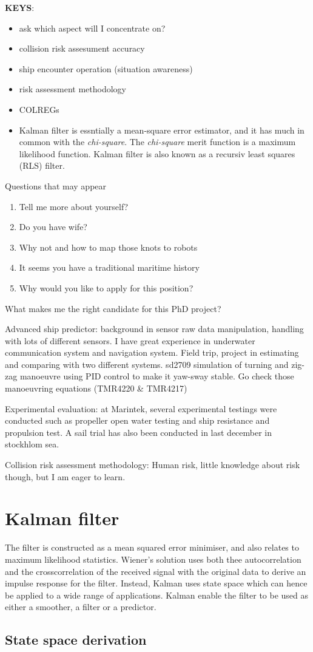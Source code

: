 \documentclass{report}
\begin{document}
{\bf KEYS}:
\begin{itemize}
\item ask which aspect will I concentrate on?
\item collision risk assesument accuracy
\item ship encounter operation (situation awareness)
\item risk assessment methodology
\item COLREGs
\item Kalman filter is essntially a mean-square error estimator, and it has much in common with the {\it chi-square}. The {\it chi-square} merit function is a maximum likelihood function. Kalman filter is also known as a recursiv least squares (RLS) filter.
\end{itemize}

Questions that may appear
\begin{enumerate}
\item Tell me more about yourself?
\item Do you have wife?
\item Why not and how to map those knots to robots
\item It seems you have a traditional maritime history
\item Why would you like to apply for this position?
\end{enumerate}

What makes me the right candidate for this PhD project?
\begin{description}
\item Advanced ship predictor: background in sensor raw data manipulation, handling with lots of different sensors. I have great experience in underwater communication system and navigation system. Field trip, project in estimating and comparing with two different systems. sd2709 simulation of turning and zig-zag manoeuvre using PID control to make it yaw-sway stable. Go check those manoeuvring equations (TMR4220 & TMR4217)
\item Experimental evaluation: at Marintek, several experimental testings were conducted such as propeller open water testing and ship resistance and propulsion test. A sail trial has also been conducted in last december in stockhlom sea. 
\item Collision risk assessment methodology: Human risk, little knowledge about risk though, but I am eager to learn.
\end{description}

\pagebreak
\chapter{Kalman filter}
The filter is constructed as a mean squared error minimiser, and also relates to maximum likelihood statistics. Wiener's solution uses both thee autocorrelation and the crosscorrelation of the received signal with the original data to derive an impulse response for the filter. Instead, Kalman uses state space which can hence be applied to a wide range of applications. Kalman enable the filter to be used as either a smoother, a filter or a predictor.
\section{State space derivation}
\end{document}
